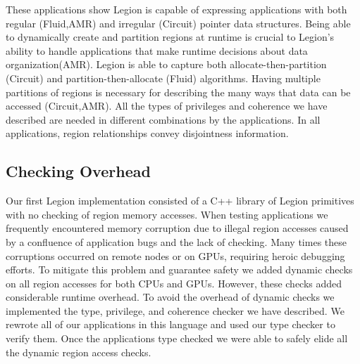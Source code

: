These applications show Legion is capable of 
expressing applications with both regular (Fluid,AMR) and irregular (Circuit) pointer data structures.
Being able to dynamically create and partition regions at runtime is crucial to Legion's
ability to handle applications that make runtime decisions about data organization(AMR).  Legion
is able to capture both allocate-then-partition (Circuit) and partition-then-allocate (Fluid) algorithms. 
Having multiple partitions of regions is necessary for describing the many ways 
that data can be accessed (Circuit,AMR).  All the types of privileges and coherence we have
described are needed in different combinations by the applications.  In
all applications, region relationships convey disjointness information.

\subsection{Checking Overhead}
\label{subsec:overhead}
Our first Legion implementation consisted of a C++ library of Legion primitives
\cite{Legion12} with no checking of region memory accesses.  
When testing applications we frequently encountered memory corruption due to
illegal region accesses caused by a confluence of application bugs and the lack of checking.  Many times these corruptions 
occurred on remote nodes or on GPUs, requiring heroic debugging efforts.
To mitigate this problem and guarantee safety we added 
dynamic checks on  all region accesses for both CPUs and GPUs.  However, these checks
added considerable runtime overhead.  
To avoid the overhead of dynamic checks we implemented the type, privilege, and coherence checker we have described. 
We rewrote all of our applications in this language and used our type checker to verify them.  Once the applications type checked we were
able to safely elide all the dynamic region access checks.



